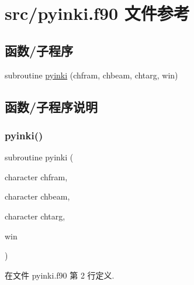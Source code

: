 \hypertarget{pyinki_8f90}{}\section{src/pyinki.f90 文件参考}
\label{pyinki_8f90}
\subsection*{函数/子程序}
\begin{DoxyCompactItemize}
\item 
subroutine \mbox{\hyperlink{pyinki_8f90_ae77e63debb43cbe29863797dcb9f4f09}{pyinki}} (chfram, chbeam, chtarg, win)
\end{DoxyCompactItemize}


\subsection{函数/子程序说明}
\mbox{\label{pyinki_8f90_ae77e63debb43cbe29863797dcb9f4f09}} 
\subsubsection{\texorpdfstring{pyinki()}{pyinki()}}
{\footnotesize\ttfamily subroutine pyinki (\begin{DoxyParamCaption}\item[{character}]{chfram,  }\item[{character}]{chbeam,  }\item[{character}]{chtarg,  }\item[{}]{win }\end{DoxyParamCaption})}



在文件 pyinki.\+f90 第 2 行定义.

